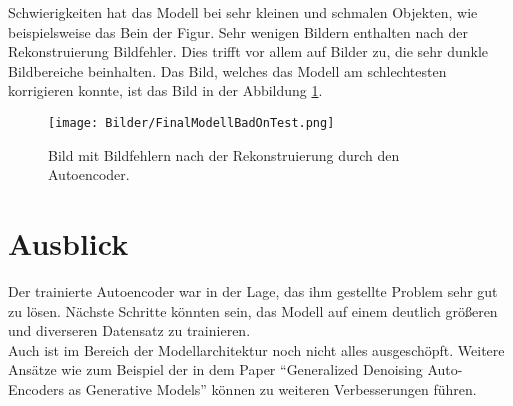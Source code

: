 \documentclass[conference]{IEEEtran}
\begin{document}
Schwierigkeiten hat das Modell bei sehr kleinen und schmalen Objekten, wie beispielsweise das Bein der Figur. Sehr wenigen Bildern enthalten nach der Rekonstruierung Bildfehler. Dies trifft vor allem auf Bilder zu, die sehr dunkle Bildbereiche beinhalten. Das Bild, welches das Modell am schlechtesten korrigieren konnte, ist das Bild in der Abbildung \ref{FinalModellBadOnTest}.
\begin{figure}[h]
	\begin{center}
		\texttt{[image: Bilder/FinalModellBadOnTest.png]}
		\caption{Bild mit Bildfehlern nach der Rekonstruierung durch den Autoencoder.}
		\label{FinalModellBadOnTest}
	\end{center}
\end{figure}

\section{Ausblick}
Der trainierte Autoencoder war in der Lage, das ihm gestellte Problem sehr gut zu lösen. Nächste Schritte könnten sein, das Modell auf einem deutlich größeren und diverseren Datensatz zu trainieren.\\
Auch ist im Bereich der Modellarchitektur noch nicht alles ausgeschöpft. Weitere Ansätze wie zum Beispiel der in dem Paper “Generalized Denoising Auto-Encoders as Generative
Models” \cite{Generative} können zu weiteren Verbesserungen führen.
\end{document}
